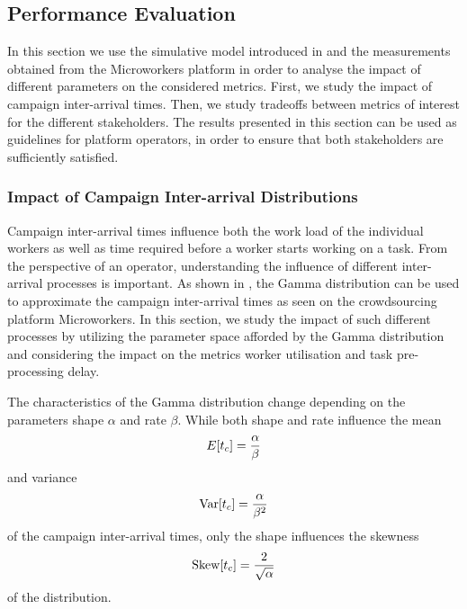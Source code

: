 \subsection{Performance Evaluation}\label{sec:cloud:crowdsourcing:performance_evaluation}

In this section we use the simulative model introduced in  and the measurements obtained from the Microworkers platform in order to analyse the impact of different parameters on the considered metrics.
First, we study the impact of campaign inter-arrival times.
Then, we study tradeoffs between metrics of interest for the different stakeholders.
The results presented in this section can be used as guidelines for platform operators, in order to ensure that both stakeholders are sufficiently satisfied.

\subsubsection*{Impact of Campaign Inter-arrival Distributions}

Campaign inter-arrival times influence both the work load of the individual workers as well as time required before a worker starts working on a task.
From the perspective of an operator, understanding the influence of different inter-arrival processes is important.
As shown in , the Gamma distribution can be used to approximate the campaign inter-arrival times as seen on the crowdsourcing platform Microworkers.
In this section, we study the impact of such different processes by utilizing the parameter space afforded by the 
Gamma distribution and considering the impact on the metrics worker utilisation and task pre-processing delay.

The characteristics of the Gamma distribution change depending on the parameters shape \(\alpha\) and rate \(\beta\).
While both shape and rate influence the mean 
\begin{equation*}
E[t_c] =  \frac{\alpha}{\beta}
\end{equation*}
and variance 
\begin{equation*}
\operatorname{Var}[t_c] =  \frac{\alpha}{\beta^2}
\end{equation*}
of the campaign inter-arrival times, only the shape influences the skewness 
\begin{equation*}
\operatorname{Skew}[t_c] =  \frac{2}{\sqrt{\alpha}}
\end{equation*}
of the distribution. 

